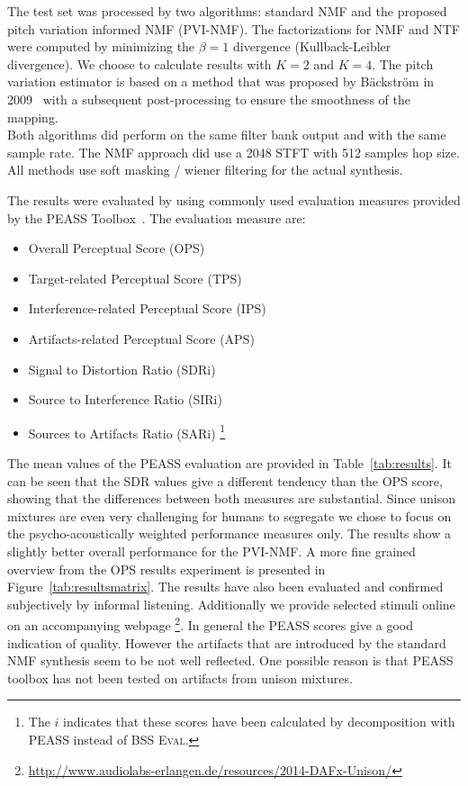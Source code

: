 The test set was processed by two algorithms: standard NMF and the proposed pitch variation informed NMF (PVI-NMF). The factorizations for NMF and NTF were computed by minimizing the $\beta = 1$ divergence (Kullback-Leibler divergence).
We choose to calculate results with $K=2$ and $K=4$.
The pitch variation estimator is based on a method that was proposed by B\"ackstr\"om in 2009~\cite{backstrom09} with a subsequent post-processing to ensure the smoothness of the mapping. \\

Both algorithms did perform on the same filter bank output and with the same sample rate. The NMF approach did use a 2048 STFT with 512 samples hop size.
All methods use soft masking / wiener filtering for the actual synthesis.

The results were evaluated by using commonly used evaluation measures provided by the {PEASS} Toolbox~\cite{emiya11}. The evaluation measure are:

\begin{itemize}
  \item Overall Perceptual Score (OPS)
  \item Target-related Perceptual Score (TPS)
  \item Interference-related Perceptual Score (IPS)
  \item Artifacts-related Perceptual Score (APS)
  \item Signal to Distortion Ratio (SDRi)
  \item Source to Interference Ratio (SIRi)
  \item Sources to Artifacts Ratio (SARi) \footnote{The $i$ indicates that these scores have been calculated by decomposition with PEASS \cite{emiya11} instead of \textsc{BSS Eval}.}
\end{itemize}

The mean values of the PEASS evaluation are provided in Table~\ref{tab:results}. It can be seen that the SDR values give a different tendency than the OPS score, showing that the differences between both measures are substantial. Since unison mixtures are even very challenging for humans to segregate we chose to focus on the psycho-acoustically weighted performance measures only. The results show a slightly better overall performance for the PVI-NMF. A more fine grained overview from the OPS results experiment is presented in Figure~\ref{tab:resultsmatrix}.
The results have also been evaluated and confirmed subjectively by informal listening. Additionally we provide selected stimuli online on an accompanying webpage \footnote{\url{http://www.audiolabs-erlangen.de/resources/2014-DAFx-Unison/}}. In general the PEASS scores give a good indication of quality. However the artifacts that are introduced by the standard NMF synthesis seem to be not well reflected. One possible reason is that PEASS toolbox has not been tested on artifacts from unison mixtures. \\

